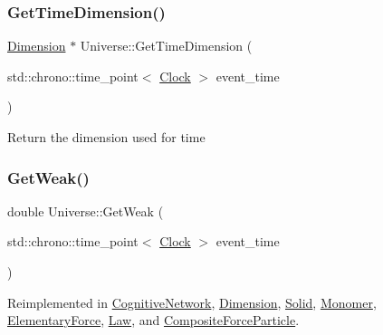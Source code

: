 \mbox{\label{classUniverse_a79b95c06aadea69cec3b51046cd9e0f8}} 
\subsubsection{\texorpdfstring{Get\+Time\+Dimension()}{GetTimeDimension()}}
{\footnotesize\ttfamily \mbox{\hyperlink{classDimension}{Dimension}} $\ast$ Universe\+::\+Get\+Time\+Dimension (\begin{DoxyParamCaption}\item[{std\+::chrono\+::time\+\_\+point$<$ \mbox{\hyperlink{universe_8h_a0ef8d951d1ca5ab3cfaf7ab4c7a6fd80}{Clock}} $>$}]{event\+\_\+time }\end{DoxyParamCaption})}

Return the dimension used for time\mbox{\label{classUniverse_a4476b7e0a3fc1764909f556257fd9ec7}} 
\subsubsection{\texorpdfstring{Get\+Weak()}{GetWeak()}}
{\footnotesize\ttfamily double Universe\+::\+Get\+Weak (\begin{DoxyParamCaption}\item[{std\+::chrono\+::time\+\_\+point$<$ \mbox{\hyperlink{universe_8h_a0ef8d951d1ca5ab3cfaf7ab4c7a6fd80}{Clock}} $>$}]{event\+\_\+time }\end{DoxyParamCaption})\hspace{0.3cm}{\ttfamily [virtual]}}



Reimplemented in \mbox{\hyperlink{classCognitiveNetwork_a761db75ac8eab7b4625e5a398891bd12}{Cognitive\+Network}}, \mbox{\hyperlink{classDimension_a656ce92d07ea600cc0ec53865ad515e2}{Dimension}}, \mbox{\hyperlink{classSolid_ac8a7738735a6bda4e89414a2b0c370e1}{Solid}}, \mbox{\hyperlink{classMonomer_ac2070d7e39cd0b2a00aa6023ffd51f55}{Monomer}}, \mbox{\hyperlink{classElementaryForce_a4669f2ce414e508c70ae4ce0df503ad1}{Elementary\+Force}}, \mbox{\hyperlink{classLaw_a303c365b7a17997a63a74756fc72fba3}{Law}}, and \mbox{\hyperlink{classCompositeForceParticle_ab5cc0893a4063cc353ea5d2404f27b0b}{Composite\+Force\+Particle}}.

